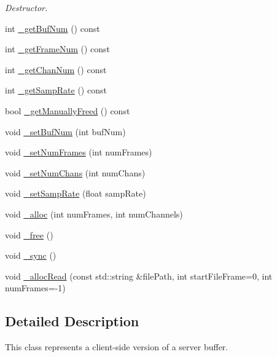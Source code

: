 \begin{DoxyCompactItemize}
\begin{DoxyCompactList}\small\item\em Destructor. \end{DoxyCompactList}\item 
int \hyperlink{classColliderPlusPlus_1_1Buffer_a6d2eb844b20eb62158d5d77bcb5d568c}{\-\_\-get\-Buf\-Num} () const 
\item 
int \hyperlink{classColliderPlusPlus_1_1Buffer_adbd84c84d0c13d9dcc96e36edce17448}{\-\_\-get\-Frame\-Num} () const 
\item 
int \hyperlink{classColliderPlusPlus_1_1Buffer_a1eca16cfed94680f3a14adcd4dfe42c9}{\-\_\-get\-Chan\-Num} () const 
\item 
int \hyperlink{classColliderPlusPlus_1_1Buffer_a6887218a82f341f668117cd24548921a}{\-\_\-get\-Samp\-Rate} () const 
\item 
bool \hyperlink{classColliderPlusPlus_1_1Buffer_abe0bd6783d6619ad9df0b5b6cd194d73}{\-\_\-get\-Manually\-Freed} () const 
\item 
void \hyperlink{classColliderPlusPlus_1_1Buffer_a4b9618d72d61ee996dd345a27211bb28}{\-\_\-set\-Buf\-Num} (int buf\-Num)
\item 
void \hyperlink{classColliderPlusPlus_1_1Buffer_a7edaeb1498a61623447082277c4cbb7a}{\-\_\-set\-Num\-Frames} (int num\-Frames)
\item 
void \hyperlink{classColliderPlusPlus_1_1Buffer_a7bb84b89cba1bbdcc85d5cd4e6cb8225}{\-\_\-set\-Num\-Chans} (int num\-Chans)
\item 
void \hyperlink{classColliderPlusPlus_1_1Buffer_a041e66c0645096ce0d134e6a1e1e93f3}{\-\_\-set\-Samp\-Rate} (float samp\-Rate)
\item 
void \hyperlink{classColliderPlusPlus_1_1Buffer_af0248190521ac9b499da2595f5519b12}{\-\_\-alloc} (int num\-Frames, int num\-Channels)
\item 
void \hyperlink{classColliderPlusPlus_1_1Buffer_acdb1aca3342219a321ff61645de4551f}{\-\_\-free} ()
\item 
void \hyperlink{classColliderPlusPlus_1_1Buffer_a2fd3166c7e5f7980176f265d4c6d8a53}{\-\_\-sync} ()
\item 
void \hyperlink{classColliderPlusPlus_1_1Buffer_a0cbb99a9823f18b151f7f7da4bcf56a7}{\-\_\-alloc\-Read} (const std\-::string \&file\-Path, int start\-File\-Frame=0, int num\-Frames=-\/1)
\end{DoxyCompactItemize}


\subsection{Detailed Description}
This class represents a client-\/side version of a server buffer. 

